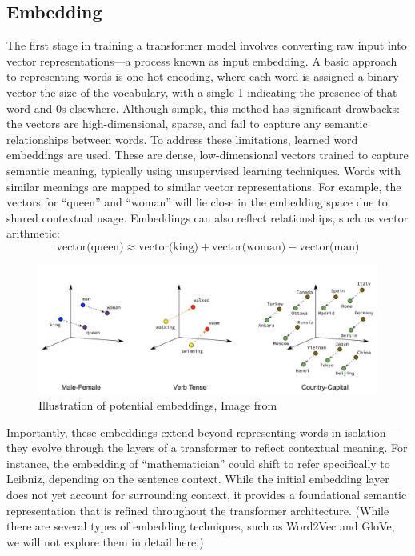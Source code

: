 \subsection{Embedding}
The first stage in training a transformer model involves converting raw input into vector representations—a process known as 
input embedding. A basic approach to representing words is one-hot encoding, where each word is assigned a binary vector the 
size of the vocabulary, with a single 1 indicating the presence of that word and 0s elsewhere. Although simple, this method 
has significant drawbacks: the vectors are high-dimensional, sparse, and fail to capture any semantic relationships between 
words.\newline 
To address these limitations, learned word embeddings are used. These are dense, low-dimensional vectors trained to capture 
semantic meaning, typically using unsupervised learning techniques. Words with similar meanings are mapped to similar vector 
representations. For example, the vectors for “queen” and “woman” will lie close in the embedding space due to shared 
contextual usage. Embeddings can also reflect relationships, such as vector arithmetic:
$$\text{vector(queen)}\approx \text{vector(king)}+\text{vector(woman)}-\text{vector(man)} $$
\begin{figure}[H]
    \centering
    \includegraphics[width=0.8\linewidth]{images/embeddings.jpg}
    \caption{Illustration of potential embeddings, Image from \cite{WordVectors}}
    \label{embeddings}
\end{figure}
Importantly, these embeddings extend beyond representing words in isolation—they evolve through the layers of a transformer to
reflect contextual meaning. For instance, the embedding of “mathematician” could shift to refer specifically to Leibniz, 
depending on the sentence context. While the initial embedding layer does not yet account for surrounding context, it provides 
a foundational semantic representation that is refined throughout the transformer architecture.
(While there are several types of embedding techniques, such as Word2Vec and GloVe, we will not explore them in detail here.)

